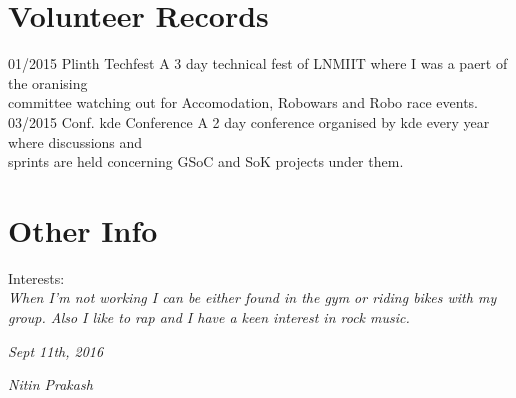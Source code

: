 \documentclass[]{friggeri-cv}
\begin{document}
\section{Volunteer Records}
\begin{entrylist}
  \entry
    {01/2015}
    {Plinth}
    {Techfest}
    {A 3 day technical fest of LNMIIT where I was a paert of the oranising \\committee watching out for Accomodation, Robowars and Robo race events.\\}
  \entry
    {03/2015}
    {Conf. kde}
    {Conference}
    {A 2 day conference organised by kde every year where discussions and \\sprints are held concerning GSoC and SoK projects under them.\\}
\end{entrylist}


\section{Other Info}
Interests:\\
\emph{When I'm not working I can be either found in the gym or riding bikes with my group. Also I like to rap and I have a keen interest in rock music.}
\\
\begin{flushleft}
\emph{Sept 11th, 2016}
\end{flushleft}
\begin{flushright}
\emph{Nitin Prakash}
\end{flushright}
\end{document}

